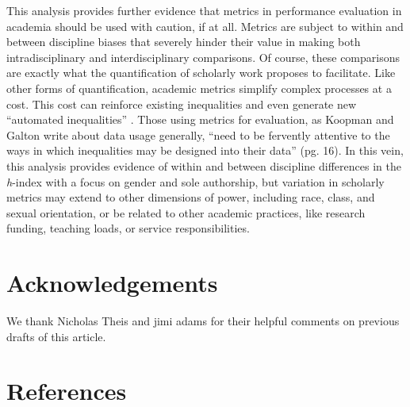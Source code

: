 \documentclass[
  10pt,
  letterpaper,
]{article}
\begin{document}
This analysis provides further evidence that metrics in performance
evaluation in academia should be used with caution, if at all. Metrics
are subject to within and between discipline biases that severely hinder
their value in making both intradisciplinary and interdisciplinary
comparisons. Of course, these comparisons are exactly what the
quantification of scholarly work proposes to facilitate. Like other
forms of quantification, academic metrics simplify complex processes at
a cost. This cost can reinforce existing inequalities and even generate
new ``automated inequalities'' \citep{eubanks_automating_2018}. Those
using metrics for evaluation, as Koopman and Galton
\citep{koopman_galton_2023} write about data usage generally, ``need to
be fervently attentive to the ways in which inequalities may be designed
into their data'' (pg. 16). In this vein, this analysis provides
evidence of within and between discipline differences in the
\emph{h}-index with a focus on gender and sole authorship, but variation
in scholarly metrics may extend to other dimensions of power, including
race, class, and sexual orientation, or be related to other academic
practices, like research funding, teaching loads, or service
responsibilities.

\section{Acknowledgements}\label{acknowledgements}

We thank Nicholas Theis and jimi adams for their helpful comments on
previous drafts of this article.

\section{References}\label{references}
\end{document}
